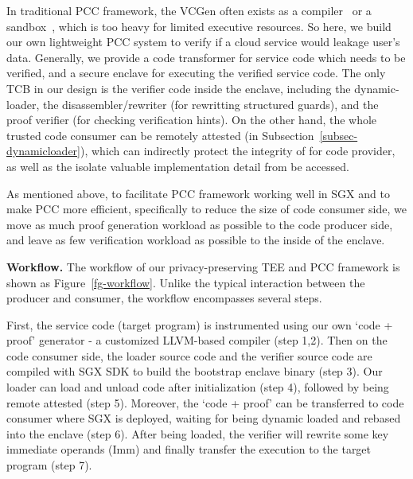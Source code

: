 {In traditional PCC framework, the VCGen often exists as a compiler~\cite{colby2000certifying,leroy2006formal} or a sandbox~\cite{pirzadeh2010extended}, which is too heavy for limited executive resources. So here, we build our own lightweight PCC system to verify if a cloud service would leakage user’s data. Generally, we provide a code transformer for service code which needs to be verified, and a secure enclave for executing the verified service code. The only TCB in our design is the verifier code inside the enclave, including the dynamic-loader, the disassembler/rewriter (for rewritting structured guards), and the proof verifier (for checking verification hints). On the other hand, the whole trusted code consumer can be remotely attested (in Subsection~\ref{subsec-dynamicloader}), which can indirectly protect the integrity of for code provider, as well as the isolate valuable implementation detail from be accessed.

As mentioned above, to facilitate PCC framework working well in SGX and to make PCC more efficient, specifically to reduce the size of code consumer side, we move as much proof generation workload as possible to the code producer side, and leave as few verification workload as possible to the inside of the enclave.



\vspace{3pt}\noindent\textbf{Workflow.} The workflow of our privacy-preserving TEE and PCC framework is shown as Figure~\ref{fg-workflow}. Unlike the typical interaction between the producer and consumer, the workflow encompasses several steps. 

First, the service code (target program) is instrumented using our own `code + proof' generator - a customized LLVM-based compiler (step 1,2). Then on the code consumer side, the loader source code and the verifier source code are compiled with SGX SDK to build the bootstrap enclave binary (step 3). Our loader can load and unload code after initialization (step 4), followed by being remote attested (step 5). Moreover, the `code + proof' can be transferred to code consumer where SGX is deployed, waiting for being dynamic loaded and rebased into the enclave (step 6). After being loaded, the verifier will rewrite some key immediate operands (Imm) and finally transfer the execution to the target program (step 7). 

}
